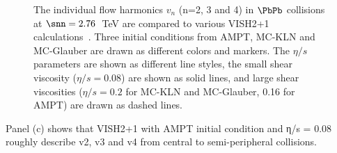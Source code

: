 \begin{figure}[h]
\begin{center}
        \caption{The individual flow harmonics $v_n$ (n=2, 3 and 4) in $\PbPb$ collisions at $\snn=2.76$~TeV are compared to various VISH2+1 calculations~\cite{Zhu:2016puf}. Three initial conditions from AMPT, MC-KLN and MC-Glauber are drawn as different colors and markers. The $\eta/s$ parameters are shown as different line styles, the small shear viscosity ($\eta/s=0.08$) are shown as solid lines, and large shear viscosities ($\eta/s=0.2$ for MC-KLN and MC-Glauber, 0.16 for AMPT) are drawn as dashed lines.}
        \label{fig:Figure_9}
              \end{center}
\end{figure}

Panel (c) shows that VISH2+1 with AMPT initial condition and η/s = 0.08 roughly describe v2, v3 and v4 from central to semi-peripheral collisions.

